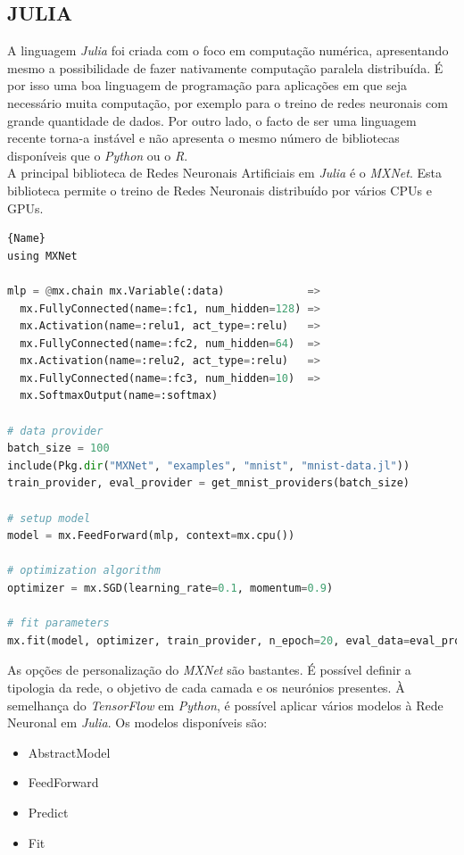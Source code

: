 \subsection*{JULIA}

A linguagem \textit{Julia} foi criada com o foco em computação numérica, apresentando mesmo a possibilidade de fazer nativamente computação paralela distribuída. É por isso uma boa linguagem de programação para aplicações em que seja necessário muita computação, por exemplo para o treino de redes neuronais com grande quantidade de dados. Por outro lado, o facto de ser uma linguagem recente torna-a instável e não apresenta o mesmo número de bibliotecas disponíveis que o \textit{Python} ou o \textit{R}.
\\A principal biblioteca de Redes Neuronais Artificiais em \textit{Julia} é o \textit{MXNet}. Esta biblioteca permite o treino de Redes Neuronais distribuído por vários CPUs e GPUs.

\begin{lstlisting}[breaklines,caption=MXNet,frame=tlrb,language=python]{Name}
using MXNet

mlp = @mx.chain mx.Variable(:data)             =>
  mx.FullyConnected(name=:fc1, num_hidden=128) =>
  mx.Activation(name=:relu1, act_type=:relu)   =>
  mx.FullyConnected(name=:fc2, num_hidden=64)  =>
  mx.Activation(name=:relu2, act_type=:relu)   =>
  mx.FullyConnected(name=:fc3, num_hidden=10)  =>
  mx.SoftmaxOutput(name=:softmax)

# data provider
batch_size = 100
include(Pkg.dir("MXNet", "examples", "mnist", "mnist-data.jl"))
train_provider, eval_provider = get_mnist_providers(batch_size)

# setup model
model = mx.FeedForward(mlp, context=mx.cpu())

# optimization algorithm
optimizer = mx.SGD(learning_rate=0.1, momentum=0.9)

# fit parameters
mx.fit(model, optimizer, train_provider, n_epoch=20, eval_data=eval_provider)
\end{lstlisting}

As opções de personalização do \textit{MXNet} são bastantes. É possível definir a tipologia da rede, o objetivo de cada camada e os neurónios presentes. À semelhança do \textit{TensorFlow} em \textit{Python}, é possível aplicar vários modelos à Rede Neuronal em \textit{Julia}. Os modelos disponíveis são:

\begin{itemize}
    \item AbstractModel
    \item FeedForward
    \item Predict
    \item Fit
\end{itemize}

